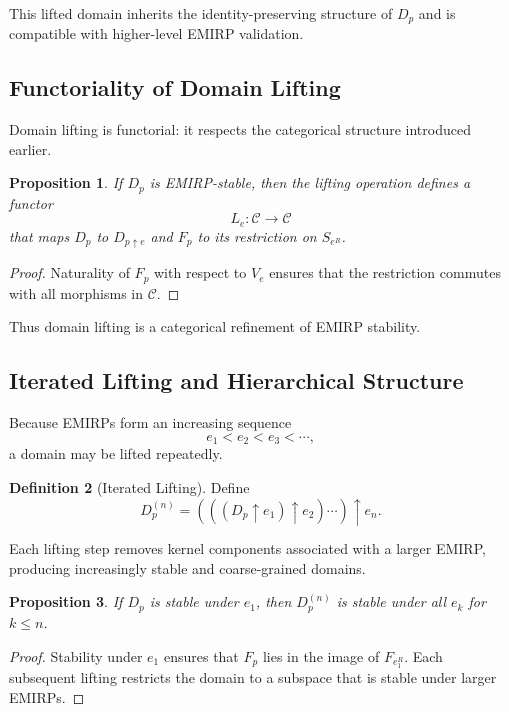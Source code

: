 \documentclass[11pt]{article}
\theoremstyle{definition}
\newtheorem{definition}{Definition}[section]
\theoremstyle{plain}
\newtheorem{proposition}[definition]{Proposition}
\theoremstyle{remark}
\begin{document}
This lifted domain inherits the identity-preserving structure of $D_p$
and is compatible with higher-level EMIRP validation.

\subsection{Functoriality of Domain Lifting}

Domain lifting is functorial: it respects the categorical structure
introduced earlier.

\begin{proposition}
If $D_p$ is EMIRP-stable, then the lifting operation defines a functor
\[
L_e : \mathcal{C} \to \mathcal{C}
\]
that maps $D_p$ to $D_{p \uparrow e}$ and $F_p$ to its restriction on
$S_{e^R}$.
\end{proposition}

\begin{proof}
Naturality of $F_p$ with respect to $V_e$ ensures that the restriction
commutes with all morphisms in $\mathcal{C}$.
\end{proof}

Thus domain lifting is a categorical refinement of EMIRP stability.

\subsection{Iterated Lifting and Hierarchical Structure}

Because EMIRPs form an increasing sequence
\[
e_1 < e_2 < e_3 < \cdots,
\]
a domain may be lifted repeatedly.

\begin{definition}[Iterated Lifting]
Define
\[
D_p^{(n)} = (((D_p \uparrow e_1) \uparrow e_2) \cdots ) \uparrow e_n.
\]
\end{definition}

Each lifting step removes kernel components associated with a larger
EMIRP, producing increasingly stable and coarse-grained domains.

\begin{proposition}
If $D_p$ is stable under $e_1$, then $D_p^{(n)}$ is stable under all
$e_k$ for $k \le n$.
\end{proposition}

\begin{proof}
Stability under $e_1$ ensures that $F_p$ lies in the image of
$F_{e_1^R}$. Each subsequent lifting restricts the domain to a
subspace that is stable under larger EMIRPs.
\end{proof}
\end{document}
